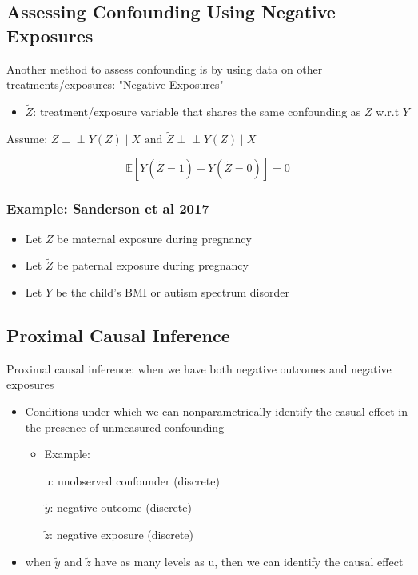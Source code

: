 \subsection{Assessing Confounding Using Negative Exposures}
Another method to assess confounding is by using data on other treatments/exposures: "Negative Exposures"
\begin{itemize}
    \item $\tilde{Z}$: treatment/exposure variable that shares the same confounding as \(Z\) w.r.t \(Y\)
\end{itemize}
\begin{center}
\end{center}
Assume: $Z \perp\!\!\!\perp Y(Z) \mid X \text{ and } \tilde{Z} \perp\!\!\!\perp Y(Z) \mid X$

\[
\mathbb{E}[Y(\tilde{Z} = 1) - Y(\tilde{Z} = 0)] = 0 
\]

\subsubsection{Example: Sanderson et al 2017}
\begin{itemize}
    \item Let \( Z \) be maternal exposure during pregnancy
    \item Let $\tilde{Z}$ be paternal exposure during pregnancy
    \item Let \( Y \) be the child's BMI or autism spectrum disorder
\end{itemize}

\subsection{Proximal Causal Inference}
Proximal causal inference: when we have both negative outcomes and negative exposures
\begin{itemize}
    \item Conditions under which we can nonparametrically identify the casual effect in the presence of unmeasured confounding 
    \begin{itemize}
    \item Example: 
    
    u: unobserved confounder (discrete)
    
    $\tilde{y}$: negative outcome (discrete)
    
    $\tilde{z}$: negative exposure (discrete)
    \end{itemize}
    \item when $\tilde{y}$ and $\tilde{z}$ have as many levels as u, then we can identify the causal effect
\end{itemize}

